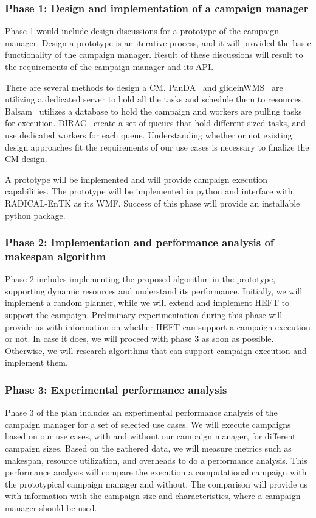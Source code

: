\subsubsection{Phase 1: Design and implementation of a campaign manager}
\label{obj1}
Phase 1 would include design discussions for a prototype of the campaign manager.
Design a prototype is an iterative process, and it will provided the basic functionality of the campaign manager.
Result of these discussions will result to the requirements of the campaign manager and its API.

There are several methods to design a CM.
PanDA~\cite{maeno2008panda} and glideinWMS~\cite{sfiligoi2008glidein} are utilizing a dedicated server to hold all the tasks and schedule them to resources.
Balsam~\cite{salim2019balsam} utilizes a database to hold the campaign and workers are pulling tasks for execution.
DIRAC~\cite{casajus2010dirac} create a set of queues that hold different sized tasks, and use dedicated workers for each queue.
Understanding whether or not existing design approaches fit the requirements of our use cases is necessary to finalize the CM design.

A prototype will be implemented and will provide campaign execution capabilities.
The prototype will be implemented in python and interface with RADICAL-EnTK as its WMF.
Success of this phase will provide an installable python package. 

\subsubsection{Phase 2: Implementation and performance analysis of makespan algorithm}
\label{obj2}
Phase 2 includes implementing the proposed algorithm in the prototype, supporting dynamic resources and understand its performance.
Initially, we will implement a random planner, while we will extend and implement HEFT to support the campaign.
Preliminary experimentation during this phase will provide us with information on whether HEFT can support a campaign execution or not.
In case it does, we will proceed with phase 3 as soon as possible.
Otherwise, we will research algorithms that can support campaign execution and implement them.

\subsubsection{Phase 3: Experimental performance analysis}
\label{obj3}
Phase 3 of the plan includes an experimental performance analysis of the campaign manager for a set of selected use cases.
We will execute campaigns based on our use cases, with and without our campaign manager, for different campaign sizes.
Based on the gathered data, we will measure metrics such as makespan, resource utilization, and overheads to do a performance analysis.
This performance analysis will compare the execution a computational campaign with the prototypical campaign manager and without.
The comparison will provide us with information with the campaign size and characteristics, where a campaign manager should be used.

